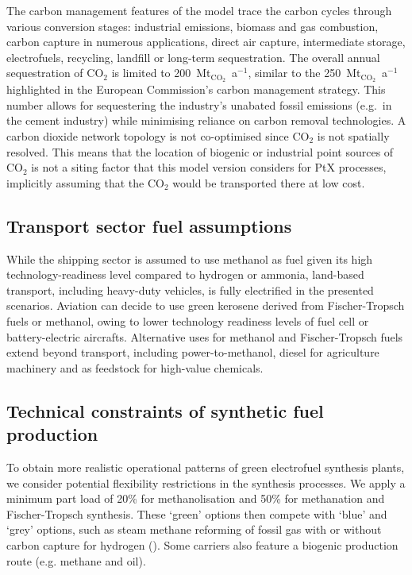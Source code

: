 The carbon management features of the model trace the carbon cycles through
various conversion stages: industrial emissions, biomass and gas combustion,
carbon capture in numerous applications, direct air capture, intermediate
storage, electrofuels, recycling, landfill or  long-term sequestration. The
overall annual sequestration of CO$_2$ is limited to
200~Mt$_{\text{CO}_2}$~a$^{-1}$, similar to the 250~Mt$_{\text{CO}_2}$~a$^{-1}$
highlighted in the European Commission's carbon management
strategy.\cite{europeancommissionAmbitiousIndustrialCarbon2024} This number
allows for sequestering the industry's unabated fossil emissions (e.g.~in the
cement industry) while minimising reliance on carbon removal technologies. A
carbon dioxide network topology is not co-optimised since CO$_2$ is not
spatially resolved. This means that the location of biogenic or industrial point
sources of CO$_2$ is not a siting factor that this model version considers for
PtX processes, implicitly assuming that the CO$_2$ would be transported there at
low cost.
\cite{hofmannDesigningCO22023,hofmannH2CO2Network2024}

\subsection*{Transport sector fuel assumptions}

While the shipping sector is assumed to use methanol as fuel given its high
technology-readiness level compared to hydrogen or
ammonia,\cite{ieaETPCleanEnergy2024} land-based transport, including heavy-duty
vehicles, is fully electrified in the presented
scenarios.\cite{linkRapidlyDecliningCosts2024} Aviation can decide to use green
kerosene derived from Fischer-Tropsch fuels or methanol, owing to lower
technology readiness levels of fuel cell or battery-electric
aircrafts.\cite{ieaETPCleanEnergy2024} Alternative uses for methanol and
Fischer-Tropsch fuels extend beyond transport, including
power-to-methanol,\cite{brownUltralongdurationEnergyStorage2023} diesel for
agriculture machinery and as feedstock for high-value chemicals.

\subsection*{Technical constraints of synthetic fuel production}

To obtain more realistic operational patterns of green electrofuel synthesis
plants, we consider potential flexibility restrictions in the synthesis
processes. We apply a minimum part load of 20\% for methanolisation and 50\% for
methanation and Fischer-Tropsch
synthesis.\cite{mucciPowerXProcessesBased2023,wentrupDynamicOperationFischerTropsch2022,dieterichPowerliquidSynthesisMethanol2020,mbathaPowermethanolProcessReview2021}
These `green' options then compete with `blue' and `grey' options, such as steam
methane reforming of fossil gas with or without carbon capture for hydrogen
(). Some carriers also feature a
biogenic production route (e.g. methane and oil).

